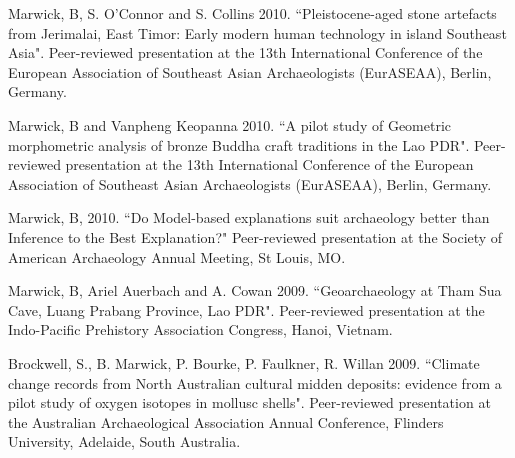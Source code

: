 \ind Marwick, B, S. O’Connor and S. Collins 2010. ``Pleistocene-aged stone artefacts from Jerimalai, East Timor: Early modern human technology in island Southeast Asia". Peer-reviewed presentation at the 13th International Conference of the European Association of Southeast Asian Archaeologists (EurASEAA), Berlin, Germany.

\ind Marwick, B and Vanpheng Keopanna 2010. ``A pilot study of Geometric morphometric analysis of bronze Buddha craft traditions in the Lao PDR". Peer-reviewed presentation  at the 13th International Conference of the European Association of Southeast Asian Archaeologists (EurASEAA), Berlin, Germany.

\ind Marwick, B, 2010. ``Do Model-based explanations suit archaeology better than Inference to the Best Explanation?" Peer-reviewed presentation at the Society of American Archaeology Annual Meeting, St Louis, MO.

\ind Marwick, B, Ariel Auerbach and A. Cowan 2009. ``Geoarchaeology at Tham Sua Cave, Luang Prabang Province, Lao PDR". Peer-reviewed presentation at the Indo-Pacific Prehistory Association Congress, Hanoi, Vietnam.

\ind Brockwell, S., B. Marwick, P. Bourke, P. Faulkner, R. Willan 2009. ``Climate change records from North Australian cultural midden deposits: evidence from a pilot study of oxygen isotopes in mollusc shells". Peer-reviewed presentation  at the Australian Archaeological Association Annual Conference, Flinders University, Adelaide, South Australia.





